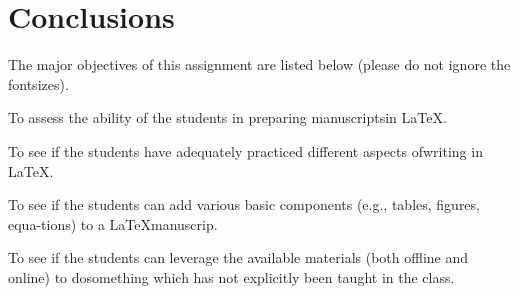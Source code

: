 \documentclass[18pt,a4paper]{article}
\begin{document}
\section{Conclusions}
The major objectives of this assignment are listed below 
(please do not ignore the fontsizes).

\begin{description}
\item[1.] {\huge To assess the ability of 
the students in preparing manuscriptsin \LaTeX .
\item[2.] }{\large To see if the students have 
adequately practiced different aspects ofwriting in \LaTeX.
\item[3.] }{ \small To see if the students can add various basic components 
(e.g., tables, figures, equa-tions) to a \LaTeX manuscrip.
\item[4.] }{\tiny To see if the students can leverage the available materials
 (both offline and online) to dosomething which has not explicitly been taught
  in the class.}
\end{description}
\end{document}
